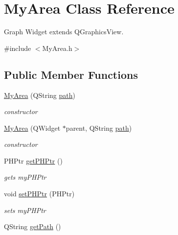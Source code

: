 \hypertarget{class_my_area}{\section{\-My\-Area \-Class \-Reference}
\label{class_my_area}
}


\-Graph \-Widget extends \-Q\-Graphics\-View.  




{\ttfamily \#include $<$\-My\-Area.\-h$>$}

\subsection*{\-Public \-Member \-Functions}
\begin{DoxyCompactItemize}
\item 
\hyperlink{class_my_area_a31f13e95c83414c538b6c46e55e19c79}{\-My\-Area} (\-Q\-String \hyperlink{class_my_area_a70561a408470de740f580da6717871bf}{path})
\begin{DoxyCompactList}\small\item\em constructor \end{DoxyCompactList}\item 
\hyperlink{class_my_area_af3c945c22987982a37dc47dad0c24615}{\-My\-Area} (\-Q\-Widget $\ast$parent, \-Q\-String \hyperlink{class_my_area_a70561a408470de740f580da6717871bf}{path})
\begin{DoxyCompactList}\small\item\em constructor \end{DoxyCompactList}\item 
\hypertarget{class_my_area_a7b94b516e730ddcee16d946c76bbc2b3}{\-P\-H\-Ptr \hyperlink{class_my_area_a7b94b516e730ddcee16d946c76bbc2b3}{get\-P\-H\-Ptr} ()}\label{class_my_area_a7b94b516e730ddcee16d946c76bbc2b3}

\begin{DoxyCompactList}\small\item\em gets my\-P\-H\-Ptr \end{DoxyCompactList}\item 
\hypertarget{class_my_area_a087c389370070a348af025aaee620fc8}{void \hyperlink{class_my_area_a087c389370070a348af025aaee620fc8}{set\-P\-H\-Ptr} (\-P\-H\-Ptr)}\label{class_my_area_a087c389370070a348af025aaee620fc8}

\begin{DoxyCompactList}\small\item\em sets my\-P\-H\-Ptr \end{DoxyCompactList}\item 
\hypertarget{class_my_area_a84edb9791a8c988cb9f13ac1ef2025d5}{\-Q\-String \hyperlink{class_my_area_a84edb9791a8c988cb9f13ac1ef2025d5}{get\-Path} ()}\label{class_my_area_a84edb9791a8c988cb9f13ac1ef2025d5}


\end{DoxyCompactItemize}
